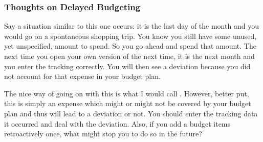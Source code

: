 \subsubsection{Thoughts on Delayed Budgeting}
\label{subsubsec:thoughts-delayed-budgeting}

Say a situation similar to this one occurs:
it is the last day of the month and you would go on a spontaneous shopping trip.
You know you still have some unused, yet unspecified, amount to spend.
So you go ahead and spend that amount.
The next time you open your own version of \tfn the next time, it is the next month and you enter the tracking correctly.
You will then see a deviation because you did not account for that expense in your budget plan.

The nice way of going on with this is what I would call .
However, better put, this is simply an expense which might or might not be covered by your budget plan and thus will lead to a deviation or not.
You should enter the tracking data it occurred and deal with the deviation.
Also, if you add a budget items retroactively once, what might stop you to do so in the future?